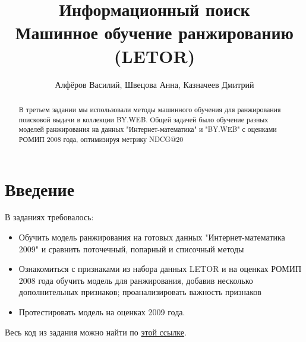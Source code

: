 \documentclass[twocolumn]{extarticle}
\title{Информационный поиск\\ Машинное обучение ранжированию (LETOR)}
\author{Алфёров Василий, Швецова Анна, Казначеев Дмитрий}
\begin{document}
\maketitle

\begin{abstract}
    В третьем задании мы использовали методы машинного обучения для ранжирования поисковой выдачи в коллекции BY.WEB. Общей задачей было обучение разных моделей ранжирования на данных "Интернет-математика" и "BY.WEB" с оценками РОМИП 2008 года, оптимизируя метрику NDCG@20 \color{red}{ВАСЯ ПОПРАВЬ ЕСЛИ ЧТО} 
\end{abstract}

\section{Введение}

В заданиях требовалось:

\begin{itemize}
\item Обучить модель ранжирования на готовых данных "Интернет-математика 2009" и сравнить поточечный, попарный и списочный методы
\item Ознакомиться с признаками из набора данных LETOR и на оценках РОМИП 2008 года обучить модель для ранжирования, добавив несколько дополнительных признаков; проанализировать важность признаков
\item Протестировать модель на оценках 2009 года.
\end{itemize}

Весь код из задания можно найти по 
\href{https://github.com/vasalf/hse-web-search-homework/tree/master/3}{этой ссылке}.




\end{document}
